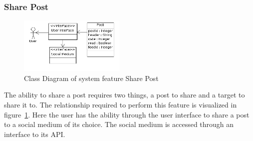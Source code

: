 \subsubsection{Share Post}
\begin{figure}[hbt]
\centering
\includegraphics[width=0.45\textwidth]
{./images/SharePost.png}
\caption{Class Diagram of system feature Share Post}
\label{fig:share}
\end{figure}
The ability to share a post requires two things, a post to share and a target to share it to. The relationship required to perform this feature is visualized in figure~\ref{fig:share}. Here the user has the ability through the user interface to share a post to a social medium of its choice. The social medium is accessed through an interface to its API. \\
